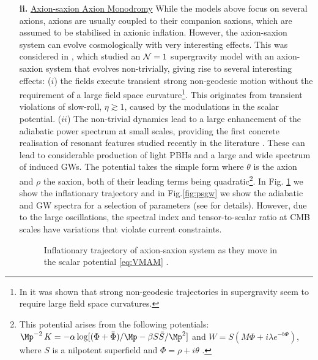 \begin{enumerate}
\item[{\bf ii.}] \underline{Axion-saxion Axion Monodromy}
While the models above focus on several axions, axions are usually coupled to their companion saxions, which are assumed to be stabilised in axionic inflation. 
However, the axion-saxion system can evolve cosmologically with very interesting effects. 
This was considered in \cite{Bhattacharya:2022fze}, which studied an ${\cal N}=1$ supergravity model with an axion-saxion system that evolves non-trivially, giving rise to several interesting effects: ($i$) the fields execute transient strong non-geodesic motion without the requirement of a large field space curvature\footnote{In \cite{Aragam:2021scu} it was shown that strong non-geodesic trajectories in supergravity seem to require large field space curvatures. }. This originates  from transient violations of slow-roll, $\eta\gtrsim1$, caused by the modulations  in the scalar potential. ($ii$) The non-trivial dynamics  lead to a large enhancement of the adiabatic power spectrum at small scales, providing the first concrete realisation of resonant features studied recently in the literature \cite{Fumagalli:2020nvq,Braglia:2020taf,Fumagalli:2021cel,Fumagalli:2021dtd}. These can lead to considerable production of light PBHs and a large and wide spectrum of induced GWs. The potential takes the simple form
\be\label{eq:VMAM}
\setlength\fboxsep{0.25cm}
\setlength\fboxrule{0.4pt}
\ee
where $\theta$ is the axion and $\rho$ the saxion, both of their  leading terms being quadratic\footnote{This potential arises from the following potentials: $\Mp^{-2}\,K = - \alpha \log[(\Phi + \bar \Phi)/\Mp -\beta S\bar S/\Mp^2]$ and
$W = S(M\Phi + i \lambda e^{- b\Phi} )$, where $S$ is a nilpotent superfield and $\Phi=\rho+ i \theta$ \cite{Ozsoy:2018flq,Bhattacharya:2022fze}.}. In Fig. \ref{fig:VMAM} we show the  
inflationary trajectory and in Fig.\ref{fig:psgw} we show the adiabatic   and GW spectra for a selection of parameters (see \cite{Bhattacharya:2022fze} for details). However, due to the large oscillations, the spectral index and tensor-to-scalar ratio at CMB scales have variations that violate current constraints. 

\begin{figure}[H]
\caption{Inflationary trajectory of axion-saxion system as they move in the scalar potential \eqref{eq:VMAM} \cite{Bhattacharya:2022fze}.}
\label{fig:VMAM}
\end{figure}


\end{enumerate}
